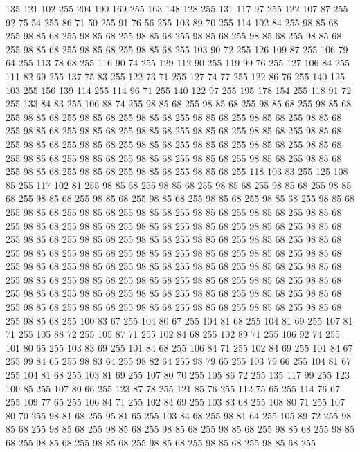 135 121 102 255 204 190 169 255 163 148 128 255 131 117 97 255 122 107 87 255 92 75 54 255 86 71 50 255 91 76 56 255 103 89 70 255 114 102 84 255 98 85 68 255 98 85 68 255 98 85 68 255 98 85 68 255 98 85 68 255 98 85 68 255 98 85 68 255 98 85 68 255 98 85 68 255 98 85 68 255 103 90 72 255 126 109 87 255 106 79 64 255 113 78 68 255 116 90 74 255 129 112 90 255 119 99 76 255 127 106 84 255 111 82 69 255 137 75 83 255 122 73 71 255 127 74 77 255 122 86 76 255 140 125 103 255 156 139 114 255 114 96 71 255 140 122 97 255 195 178 154 255 118 91 72 255 133 84 83 255 106 88 74 255 98 85 68 255 98 85 68 255 98 85 68 255 98 85 68 255 98 85 68 255 98 85 68 255 98 85 68 255 98 85 68 255 98 85 68 255 98 85 68 255 98 85 68 255 98 85 68 255 98 85 68 255 98 85 68 255 98 85 68 255 98 85 68 255 98 85 68 255 98 85 68 255 98 85 68 255 98 85 68 255 98 85 68 255 98 85 68 255 98 85 68 255
98 85 68 255 98 85 68 255 98 85 68 255 98 85 68 255 98 85 68 255 98 85 68 255 98 85 68 255 98 85 68 255 98 85 68 255 118 103 83 255 125 108 85 255 117 102 81 255 98 85 68 255 98 85 68 255 98 85 68 255 98 85 68 255 98 85 68 255 98 85 68 255 98 85 68 255 98 85 68 255 98 85 68 255 98 85 68 255 98 85 68 255 98 85 68 255 98 85 68 255 98 85 68 255 98 85 68 255 98 85 68 255 98 85 68 255 98 85 68 255 98 85 68 255 98 85 68 255 98 85 68 255 98 85 68 255 98 85 68 255 98 85 68 255 98 85 68 255 98 85 68 255 98 85 68 255 98 85 68 255 98 85 68 255 98 85 68 255 98 85 68 255 98 85 68 255 98 85 68 255 98 85 68 255 98 85 68 255 98 85 68 255 98 85 68 255 98 85 68 255 98 85 68 255 98 85 68 255 98 85 68 255 98 85 68 255 98 85 68 255 98 85 68 255 98 85 68 255 98 85 68 255 98 85 68 255 98 85 68 255 98 85 68 255 98 85 68 255 98 85 68 255 98 85 68 255
98 85 68 255 98 85 68 255 98 85 68 255 98 85 68 255 98 85 68 255 98 85 68 255 98 85 68 255 98 85 68 255 100 83 67 255 104 80 67 255 104 81 68 255 104 81 69 255 107 81 71 255 105 88 72 255 105 87 71 255 102 84 68 255 102 89 71 255 106 92 74 255 101 80 65 255 103 83 69 255 101 84 68 255 106 84 71 255 102 84 69 255 101 84 67 255 99 84 65 255 98 83 64 255 98 82 64 255 98 79 65 255 103 79 66 255 104 81 67 255 104 81 68 255 103 81 69 255 107 80 70 255 105 86 72 255 135 117 99 255 123 100 85 255 107 80 66 255 123 87 78 255 121 85 76 255 112 75 65 255 114 76 67 255 109 77 65 255 106 84 71 255 102 84 69 255 103 83 68 255 108 80 71 255 107 80 70 255 98 81 68 255 95 81 65 255 103 84 68 255 98 81 64 255 105 89 72 255 98 85 68 255 98 85 68 255 98 85 68 255 98 85 68 255 98 85 68 255 98 85 68 255 98 85 68 255 98 85 68 255 98 85 68 255 98 85 68 255 98 85 68 255 98 85 68 255
